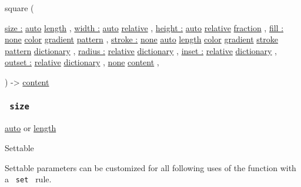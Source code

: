 { square } (

{ \hyperref[parameters-size]{size :}
\href{/docs/reference/foundations/auto/}{auto}
\href{/docs/reference/layout/length/}{length} , } {
\hyperref[parameters-width]{width :}
\href{/docs/reference/foundations/auto/}{auto}
\href{/docs/reference/layout/relative/}{relative} , } {
\hyperref[parameters-height]{height :}
\href{/docs/reference/foundations/auto/}{auto}
\href{/docs/reference/layout/relative/}{relative}
\href{/docs/reference/layout/fraction/}{fraction} , } {
\hyperref[parameters-fill]{fill :}
\href{/docs/reference/foundations/none/}{none}
\href{/docs/reference/visualize/color/}{color}
\href{/docs/reference/visualize/gradient/}{gradient}
\href{/docs/reference/visualize/pattern/}{pattern} , } {
\hyperref[parameters-stroke]{stroke :}
\href{/docs/reference/foundations/none/}{none}
\href{/docs/reference/foundations/auto/}{auto}
\href{/docs/reference/layout/length/}{length}
\href{/docs/reference/visualize/color/}{color}
\href{/docs/reference/visualize/gradient/}{gradient}
\href{/docs/reference/visualize/stroke/}{stroke}
\href{/docs/reference/visualize/pattern/}{pattern}
\href{/docs/reference/foundations/dictionary/}{dictionary} , } {
\hyperref[parameters-radius]{radius :}
\href{/docs/reference/layout/relative/}{relative}
\href{/docs/reference/foundations/dictionary/}{dictionary} , } {
\hyperref[parameters-inset]{inset :}
\href{/docs/reference/layout/relative/}{relative}
\href{/docs/reference/foundations/dictionary/}{dictionary} , } {
\hyperref[parameters-outset]{outset :}
\href{/docs/reference/layout/relative/}{relative}
\href{/docs/reference/foundations/dictionary/}{dictionary} , } {
\hyperref[parameters-body]{}
\href{/docs/reference/foundations/none/}{none}
\href{/docs/reference/foundations/content/}{content} , }

) -\textgreater{} \href{/docs/reference/foundations/content/}{content}

\subsubsection{\texorpdfstring{\texttt{\ size\ }}{ size }}\label{parameters-size}

\href{/docs/reference/foundations/auto/}{auto} {or}
\href{/docs/reference/layout/length/}{length}

{{ Settable }}

\label{parameters-size-settable-tooltip}
Settable parameters can be customized for all following uses of the
function with a \texttt{\ set\ } rule.

